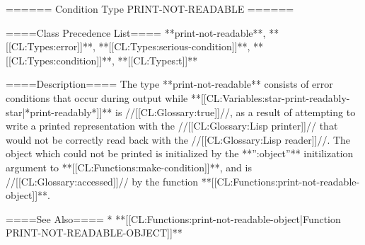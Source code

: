 ====== Condition Type PRINT-NOT-READABLE ======

====Class Precedence List==== 
**print-not-readable**, **[[CL:Types:error]]**, **[[CL:Types:serious-condition]]**, **[[CL:Types:condition]]**, **[[CL:Types:t]]**

====Description====
The type **print-not-readable** consists of error conditions that occur during output while **[[CL:Variables:star-print-readably-star|*print-readably*]]** is //[[CL:Glossary:true]]//, as a result of attempting to write a printed representation with the //[[CL:Glossary:Lisp printer]]// that would not be correctly read back with the //[[CL:Glossary:Lisp reader]]//. The object which could not be printed is initialized by the **'':object''** initilization argument to **[[CL:Functions:make-condition]]**, and is //[[CL:Glossary:accessed]]// by the function **[[CL:Functions:print-not-readable-object]]**.

====See Also====
  * **[[CL:Functions:print-not-readable-object|Function PRINT-NOT-READABLE-OBJECT]]**

